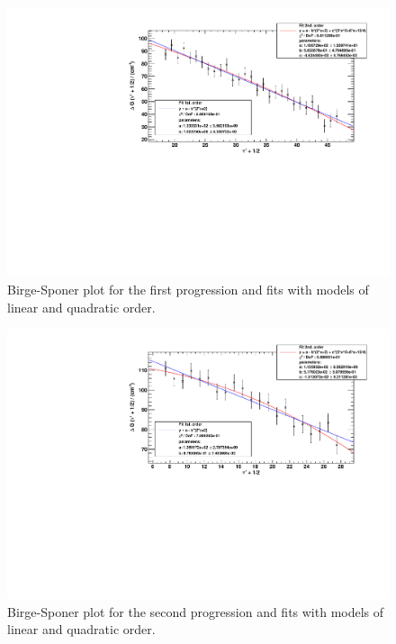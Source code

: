\begin{figure}[H]
\begin{center}
  \includegraphics[width=\textwidth]{../img/prog1_birgesponer.pdf}
  \caption[---]{Birge-Sponer plot for the first progression and fits with models of linear and quadratic order.}
  \label{img:prog1}
\end{center}
\end{figure}


\begin{figure}[H]
\begin{center}
  \includegraphics[width=\textwidth]{../img/prog2_birgesponer.pdf}
  \caption[---]{Birge-Sponer plot for the second progression and fits with models of linear and quadratic order.}
  \label{img:prog2}
\end{center}
\end{figure}


